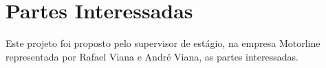 \section{Partes Interessadas}

Este projeto foi proposto pelo supervisor de estágio, na empresa Motorline representada por Rafael Viana e André Viana, as partes interessadas.
